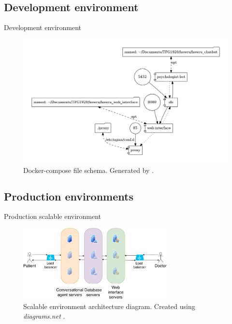 \documentclass{beamer}
\begin{document}
\subsection{Development environment}
\begin{frame}[fragile]{Development environment}
  \begin{figure}[H]
    \centering
      \includegraphics[width=\textwidth]{docker-compose.png}
      \caption{Docker-compose file schema. Generated by \protect\cite{dockerviz}.}
  \end{figure}
\end{frame}
\subsection{Production environments}
\begin{frame}[fragile]{Production scalable environment}
  \begin{figure}[H]
    \centering
    \includegraphics[width=0.7\textwidth]{scalable.pdf}
    \caption{Scalable environment architecture diagram. Created using \emph{diagrams.net} \protect\cite{drawio}.}
  \end{figure}
\end{frame}
\end{document}
